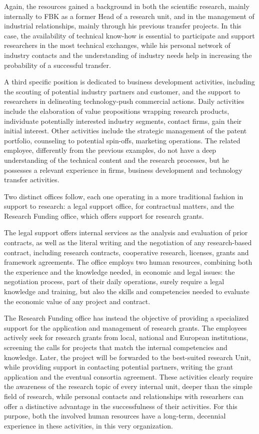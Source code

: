 Again, the resources gained a background in both the scientific research, mainly internally to FBK as a former Head of a research unit, and in the management of industrial relationships, mainly through his previous transfer projects. In this case, the availability of technical know-how is essential to participate and support researchers in the most technical exchanges, while his personal network of industry contacts and the understanding of industry needs help in increasing the probability of a successful transfer.

A third specific position is dedicated to business development activities, including the scouting of potential industry partners and customer, and the support to researchers in delineating technology-push commercial actions. Daily activities include the elaboration of value propositions wrapping research products, individuate potentially interested industry segments, contact firms, gain their initial interest. Other activities include the strategic management of the patent portfolio, counseling to potential spin-offs, marketing operations. The related employee, differently from the previous examples, do not have a deep understanding of the technical content and the research processes, but he possesses a relevant experience in firms, business development and technology transfer activities.

Two distinct offices follow, each one operating in a more traditional fashion in support to research: a legal support office, for contractual matters, and the Research Funding office, which offers support for research grants.

The legal support offers internal services as the analysis and evaluation of prior contracts, as well as the literal writing and the negotiation of any research-based contract, including research contracts, cooperative research, licenses, grants and framework agreements. The office employs two human resources, combining both the experience and the knowledge needed, in economic and legal issues: the negotiation process, part of their daily operations, surely require a legal knowledge and training, but also the skills and competencies needed to evaluate the economic value of any project and contract. 

The Research Funding office has instead the objective of providing a specialized support for the application and management of research grants. The employees actively seek for research grants from local, national and European institutions, screening the calls for projects that match the internal competencies and knowledge. Later, the project will be forwarded to the best-suited research Unit, while providing support in contacting potential partners, writing the grant application and the eventual consortia agreement. These activities clearly require the awareness of the research topic of every internal unit, deeper than the simple field of research, while personal contacts and relationships with researhers can offer a distinctive advantage in the successfulness of their activities. For this purpose, both the involved human resources have a long-term, decennial experience in these activities, in this very organization.

